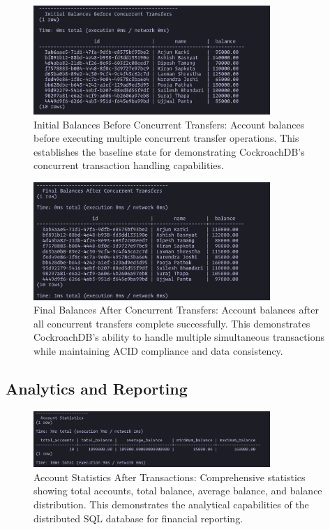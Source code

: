 \begin{figure}[H]
  \centering
  \includegraphics[width=0.8\textwidth]{task-5/screenshots/initial-before-concurrent.png}
  \caption{Initial Balances Before Concurrent Transfers: Account balances before executing multiple concurrent transfer operations. This establishes the baseline state for demonstrating CockroachDB's concurrent transaction handling capabilities.}
  \label{fig:task5-initial-before-concurrent}
\end{figure}

\begin{figure}[H]
  \centering
  \includegraphics[width=0.8\textwidth]{task-5/screenshots/final-after-concurrent.png}
  \caption{Final Balances After Concurrent Transfers: Account balances after all concurrent transfers complete successfully. This demonstrates CockroachDB's ability to handle multiple simultaneous transactions while maintaining ACID compliance and data consistency.}
  \label{fig:task5-final-after-concurrent}
\end{figure}

\subsection*{Analytics and Reporting}

\begin{figure}[H]
  \centering
  \includegraphics[width=0.8\textwidth]{task-5/screenshots/account-stats-after-txns.png}
  \caption{Account Statistics After Transactions: Comprehensive statistics showing total accounts, total balance, average balance, and balance distribution. This demonstrates the analytical capabilities of the distributed SQL database for financial reporting.}
  \label{fig:task5-account-stats-after-txns}
\end{figure}

